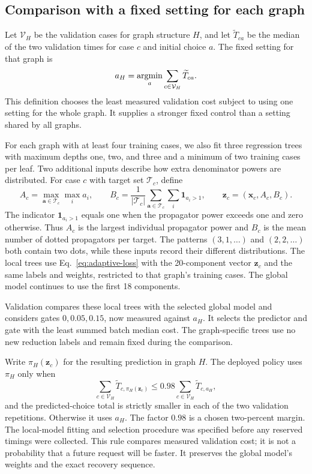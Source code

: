 \subsection{Comparison with a fixed setting for each graph}
Let $\mathcal V_H$ be the validation cases for graph structure $H$, and let $\widetilde T_{ca}$ be the median of the two validation times for case $c$ and initial choice $a$. The fixed setting for that graph is
\begin{equation}
 a_H=\mathop{\rm argmin}_a\sum_{c\in\mathcal V_H}\widetilde T_{ca}.
 \label{eq:adaptive-graph-fixed}
\end{equation}
This definition chooses the least measured validation cost subject to using one setting for the whole graph. It supplies a stronger fixed control than a setting shared by all graphs.

For each graph with at least four training cases, we also fit three regression trees with maximum depths one, two, and three and a minimum of two training cases per leaf. Two additional inputs describe how extra denominator powers are distributed. For case $c$ with target set $\mathcal{T}_c$, define
\begin{equation}
 A_c=\max_{\boldsymbol a\in\mathcal{T}_c}\max_i a_i,\qquad
 B_c=\frac{1}{|\mathcal{T}_c|}\sum_{\boldsymbol a\in\mathcal{T}_c}\sum_i\mathbf 1_{a_i>1},\qquad
 \boldsymbol z_c=(\boldsymbol x_c,A_c,B_c).
 \label{eq:adaptive-local-inputs}
\end{equation}
The indicator $\mathbf 1_{a_i>1}$ equals one when the propagator power exceeds one and zero otherwise. Thus $A_c$ is the largest individual propagator power and $B_c$ is the mean number of dotted propagators per target. The patterns $(3,1,\ldots)$ and $(2,2,\ldots)$ both contain two dots, while these inputs record their different distributions. The local trees use Eq.~\eqref{eq:adaptive-loss} with the 20-component vector $\boldsymbol z_c$ and the same labels and weights, restricted to that graph's training cases. The global model continues to use the first 18 components.

Validation compares these local trees with the selected global model and considers gates $0,0.05,0.15$, now measured against $a_H$. It selects the predictor and gate with the least summed batch median cost. The graph-specific trees use no new reduction labels and remain fixed during the comparison.

Write $\pi_H(\boldsymbol z_c)$ for the resulting prediction in graph $H$. The deployed policy uses $\pi_H$ only when
\begin{equation}
 \sum_{c\in\mathcal V_H}\widetilde T_{c,\pi_H(\boldsymbol z_c)}
 \leq 0.98\sum_{c\in\mathcal V_H}\widetilde T_{c,a_H},
 \label{eq:adaptive-graph-guard}
\end{equation}
and the predicted-choice total is strictly smaller in each of the two validation repetitions. Otherwise it uses $a_H$. The factor $0.98$ is a chosen two-percent margin. The local-model fitting and selection procedure was specified before any reserved timings were collected. This rule compares measured validation cost; it is not a probability that a future request will be faster. It preserves the global model's weights and the exact recovery sequence.

